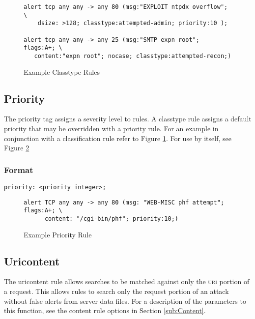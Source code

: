 \documentclass[english]{report}
\begin{document}
%
\begin{figure}[!hbpt]
\begin{verbatim}
alert tcp any any -> any 80 (msg:"EXPLOIT ntpdx overflow"; \ 
    dsize: >128; classtype:attempted-admin; priority:10 );

alert tcp any any -> any 25 (msg:"SMTP expn root"; flags:A+; \
   content:"expn root"; nocase; classtype:attempted-recon;)
\end{verbatim}
\caption{Example Classtype Rules\label{example classification rules}}
\end{figure}

\subsection{Priority}

The priority tag assigns a severity level to rules. A classtype rule
assigns a default priority that may be overridden with a priority
rule. For an example in conjunction with a classification rule refer
to Figure \ref{example classification rules}. For use by itself,
see Figure \ref{example priority rule}


\subsubsection{Format}

\begin{verbatim}
priority: <priority integer>;
\end{verbatim}
%
\begin{figure}[!hbpt]
\begin{verbatim}
alert TCP any any -> any 80 (msg: "WEB-MISC phf attempt"; flags:A+; \
      content: "/cgi-bin/phf"; priority:10;)
\end{verbatim}

\caption{Example Priority Rule\label{example priority rule}}
\end{figure}



\subsection{Uricontent}

The uricontent rule allows searches to be matched against only the
\textsc{uri} portion of a request. This allows rules to search only
the request portion of an attack without false alerts from server
data files. For a description of the parameters to this function,
see the content rule options in Section \ref{sub:Content}. 
\end{document}

